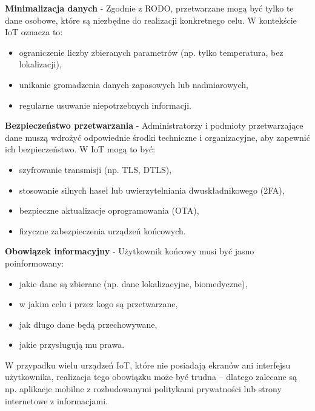 \textbf{Minimalizacja danych} - Zgodnie z RODO, przetwarzane mogą być tylko te dane osobowe, które są niezbędne do realizacji konkretnego celu. W kontekście IoT oznacza to:
\begin{itemize}
    \item ograniczenie liczby zbieranych parametrów (np. tylko temperatura, bez lokalizacji),
    
    \item unikanie gromadzenia danych zapasowych lub nadmiarowych,
    
    \item regularne usuwanie niepotrzebnych informacji.
\end{itemize}

\textbf{Bezpieczeństwo przetwarzania} - Administratorzy i podmioty przetwarzające dane muszą wdrożyć odpowiednie środki techniczne i organizacyjne, aby zapewnić ich bezpieczeństwo. W IoT mogą to być:
\begin{itemize}
    \item szyfrowanie transmisji (np. TLS, DTLS),
    
    \item stosowanie silnych haseł lub uwierzytelniania dwuskładnikowego (2FA),
    
    \item bezpieczne aktualizacje oprogramowania (OTA),
    
    \item fizyczne zabezpieczenia urządzeń końcowych.
\end{itemize}

\textbf{Obowiązek informacyjny} - Użytkownik końcowy musi być jasno poinformowany: 
\begin{itemize}
    \item jakie dane są zbierane (np. dane lokalizacyjne, biomedyczne),
    
    \item w jakim celu i przez kogo są przetwarzane,

    \item jak długo dane będą przechowywane,
    
    \item jakie przysługują mu prawa.
\end{itemize}
W przypadku wielu urządzeń IoT, które nie posiadają ekranów ani interfejsu użytkownika, realizacja tego obowiązku może być trudna – dlatego zalecane są np. aplikacje mobilne z rozbudowanymi politykami prywatności lub strony internetowe z informacjami.

